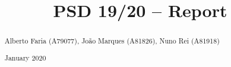 \documentclass[acmsmall,nonacm,screen]{acmart}
\begin{document}
\title{PSD 19/20 -- Report}
\makeatletter \renewcommand{\shortauthors}{\@title} \makeatother

\begin{abstract}
\large
\vspace*{-\baselineskip}
Alberto Faria (A79077), João Marques (A81826), Nuno Rei (A81918)
\vspace*{.2\baselineskip}
\par {} January 2020
\vspace*{.2\baselineskip}
\end{abstract}

\maketitle









\end{document}
